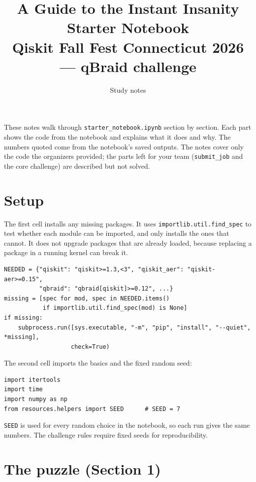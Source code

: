 \documentclass[11pt]{article}
\title{A Guide to the Instant Insanity Starter Notebook\\[4pt]
  \large Qiskit Fall Fest Connecticut 2026 --- qBraid challenge}
\author{Study notes}
\date{}
\newcommand{\code}[1]{\texttt{#1}}
\begin{document}
\maketitle

\noindent These notes walk through \code{starter\_notebook.ipynb} section by
section. Each part shows the code from the notebook and explains what it does
and why. The numbers quoted come from the notebook's saved outputs. The notes
cover only the code the organizers provided; the parts left for your team
(\code{submit\_job} and the core challenge) are described but not solved.

\tableofcontents
\newpage

\section{Setup}

The first cell installs any missing packages. It uses
\code{importlib.util.find\_spec} to test whether each module can be imported,
and only installs the ones that cannot. It does not upgrade packages that are
already loaded, because replacing a package in a running kernel can break it.

\begin{lstlisting}
NEEDED = {"qiskit": "qiskit>=1.3,<3", "qiskit_aer": "qiskit-aer>=0.15",
          "qbraid": "qbraid[qiskit]>=0.12", ...}
missing = [spec for mod, spec in NEEDED.items()
           if importlib.util.find_spec(mod) is None]
if missing:
    subprocess.run([sys.executable, "-m", "pip", "install", "--quiet", *missing],
                   check=True)
\end{lstlisting}

The second cell imports the basics and the fixed random seed:

\begin{lstlisting}
import itertools
import time
import numpy as np
from resources.helpers import SEED      # SEED = 7
\end{lstlisting}

\code{SEED} is used for every random choice in the notebook, so each run gives
the same numbers. The challenge rules require fixed seeds for reproducibility.

\section{The puzzle (Section 1)}
\end{document}
